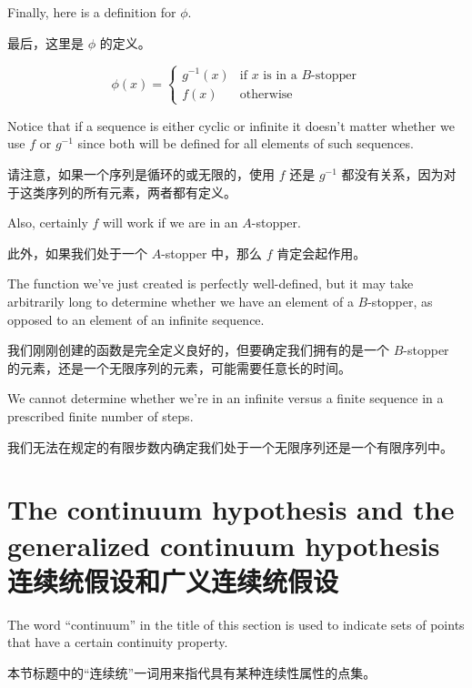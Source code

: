 Finally, here is a definition for $\phi$.

最后，这里是 $\phi$ 的定义。

\[ \phi(x) =  \left\{ \begin{array}{cl} g^{-1}(x) & \mbox{if $x$ is in a $B$-stopper} \\ f(x) & \mbox{otherwise} \end{array} \right.
\]

Notice that if a sequence is either cyclic or infinite it doesn't matter
whether we use $f$ or $g^{-1}$ since both will be
defined for all elements of such
sequences.

请注意，如果一个序列是循环的或无限的，使用 $f$ 还是 $g^{-1}$ 都没有关系，因为对于这类序列的所有元素，两者都有定义。

Also, certainly $f$ will work if we are in an $A$-stopper.

此外，如果我们处于一个 $A$-stopper 中，那么 $f$ 肯定会起作用。

The function  we've just created is perfectly well-defined, but it may take
arbitrarily long to determine whether we have an element of a $B$-stopper, as
opposed to an element of an infinite sequence.

我们刚刚创建的函数是完全定义良好的，但要确定我们拥有的是一个 $B$-stopper 的元素，还是一个无限序列的元素，可能需要任意长的时间。

We cannot determine whether
we're in an infinite versus a finite sequence in a prescribed finite number of
steps.

我们无法在规定的有限步数内确定我们处于一个无限序列还是一个有限序列中。

\clearpage





\newpage

\section[CH and GCH]{The continuum hypothesis and the generalized continuum hypothesis 连续统假设和广义连续统假设}
\label{sec:ch_gch}

The word ``continuum'' in the title of this section is used to indicate sets of
points that have a certain continuity property.

本节标题中的“连续统”一词用来指代具有某种连续性属性的点集。

